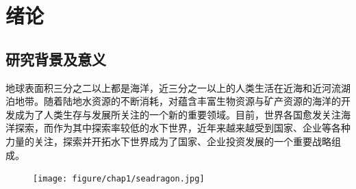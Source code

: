 



\chapter{绪论}
\label{chap:Introduction}
\section{研究背景及意义 }

地球表面积三分之二以上都是海洋，近三分之一以上的人类生活在近海和近河流湖泊地带。随着陆地水资源的不断消耗，对蕴含丰富生物资源与矿产资源的海洋的开发成为了人类生存与发展所关注的一个新的重要领域\cite{fossen1994guidance,Fossen2002Marine}。目前，世界各国愈发关注海洋探索，而作为其中探索率较低的水下世界，近年来越来越受到国家、企业等各种力量的关注，探索并开拓水下世界成为了国家、企业投资发展的一个重要战略组成\cite{bottaccini1954stablity,John1978Methods}。

\begin{figure}
\centering
\texttt{[image: figure/chap1/seadragon.jpg]}
\label{fig:chap1:F1}
\end{figure}

